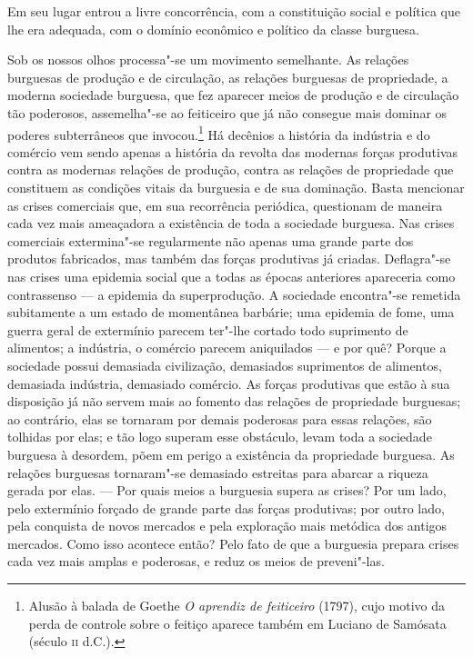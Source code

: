 Em seu lugar entrou a livre concorrência, com a constituição social e
política que lhe era adequada, com o domínio econômico e político da
classe burguesa.

Sob os nossos olhos processa"-se um movimento semelhante. As relações
burguesas de produção e de circulação, as relações burguesas de
propriedade, a moderna sociedade burguesa, que fez aparecer meios de
produção e de circulação tão poderosos, assemelha"-se ao feiticeiro
que já não consegue mais dominar os poderes subterrâneos que invocou.\footnote{Alusão à balada de Goethe \textit{O aprendiz de feiticeiro} (1797), cujo motivo da perda de controle sobre o feitiço aparece também em Luciano de Samósata (século \textsc{ii} d.C.).}
Há decênios a história da indústria e do comércio vem sendo apenas a
história da revolta das modernas forças produtivas contra as modernas
relações de produção, contra as relações de propriedade que constituem
as condições vitais da burguesia e de sua dominação. Basta mencionar as
crises comerciais que, em sua recorrência periódica, questionam de
maneira cada vez mais ameaçadora a existência de toda a sociedade
burguesa. Nas crises comerciais extermina"-se regularmente não apenas
uma grande parte dos produtos fabricados, mas também das forças
produtivas já criadas. Deflagra"-se nas crises uma epidemia social que
a todas as épocas anteriores apareceria como contrassenso  ---  a
epidemia da superprodução. A sociedade encontra"-se remetida
subitamente a um estado de momentânea barbárie; uma epidemia de fome,
uma guerra geral de extermínio parecem ter"-lhe cortado todo
suprimento de alimentos; a indústria, o comércio parecem aniquilados  --- 
e por quê? Porque a sociedade possui demasiada civilização, demasiados
suprimentos de alimentos, demasiada indústria, demasiado comércio. As
forças produtivas que estão à sua disposição já não servem mais ao
fomento das relações de propriedade burguesas; ao contrário, elas se
tornaram por demais poderosas para essas relações, são tolhidas por
elas; e tão logo superam esse obstáculo, levam toda a sociedade
burguesa à desordem, põem em perigo a existência da propriedade
burguesa. As relações burguesas tornaram"-se demasiado estreitas para
abarcar a riqueza gerada por elas. --- Por quais meios a burguesia supera    \label{9}
as crises? Por um lado, pelo extermínio forçado de grande parte das
forças produtivas; por outro lado, pela conquista de novos mercados e
pela exploração mais metódica dos antigos mercados. Como isso acontece
então? Pelo fato de que a burguesia prepara crises cada vez mais amplas
e poderosas, e reduz os meios de preveni"-las.

